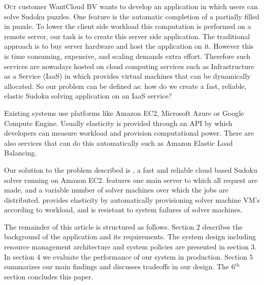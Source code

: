 \lettrine[nindent=0em,lines=3]{O}ur customer WantCloud BV wants to develop an application in which users can solve Sudoku puzzles.
One feature is the automatic completion of a partially filled in puzzle.
To lower the client side workload this computation is performed on a remote server, our task is to create this server side application.
The traditional approach is to buy server hardware and host the application on it.
However this is time consuming, expensive, and scaling demands extra effort.
Therefore such services are nowadays hosted on cloud computing services such as Infrastructure as a Service (IaaS) in which provides virtual machines that can be dynamically allocated.
So our problem can be defined as: how do we create a fast, reliable, elastic Sudoku solving application on an IaaS service?

Existing systems use platforms like Amazon EC2\cite{ec2}, Microsoft Azure\cite{azure} or Google Compute Engine\cite{google}.
Usually elasticity is provided through an API by which developers can measure workload and provision computational power.
There are also services that can do this automatically such as Amazon Elastic Load Balancing. 

Our solution to the problem described is \appName, a fast and reliable cloud based Sudoku solver running on Amazon EC2\cite{ec2}. 
\appName features one main server to which all request are made, and a variable number of solver machines over which the jobs are distributed.
\appName provides elasticity by automatically provisioning solver machine VM's according to workload, and is resistant to system failures of solver machines.

The remainder of this article is structured as follows.
Section 2 describes the background of the application and its requirements.
The system design including resource management architecture and system policies are presented in section 3.
In section 4 we evaluate the performance of our system in production. Section 5 summarizes our main findings and discusses tradeoffs in our design.
The 6$^{th}$ section concludes this paper. 
